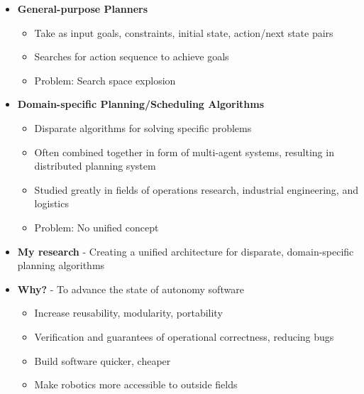 \documentclass{beamer}
\begin{document}
\begin{frame}
	\begin{itemize}
	\item \textbf{General-purpose Planners} 
		\begin{itemize}
		\item Take as input goals, constraints, initial state, action/next state pairs
		\item Searches for action sequence to achieve goals
		\item Problem: Search space explosion
		\end{itemize}
	\item \textbf{Domain-specific Planning/Scheduling Algorithms}
		\begin{itemize}
		\item Disparate algorithms for solving specific problems
		\item Often combined together in form of multi-agent systems, resulting in distributed planning system
		\item Studied greatly in fields of operations research, industrial engineering, and logistics
		\item Problem: No unified concept
		\end{itemize}
	\end{itemize}
\end{frame}


\begin{frame}
	\begin{itemize}
	\item \textbf{My research} - Creating a unified architecture for disparate, domain-specific planning algorithms
	\item \textbf{Why?} - To advance the state of autonomy software
	\begin{itemize}
	\item Increase reusability, modularity, portability
	\item Verification and guarantees of operational correctness, reducing bugs
	\item Build software quicker, cheaper
	\item Make robotics more accessible to outside fields
	\end{itemize}
	\end{itemize}
\end{frame}
\end{document}
